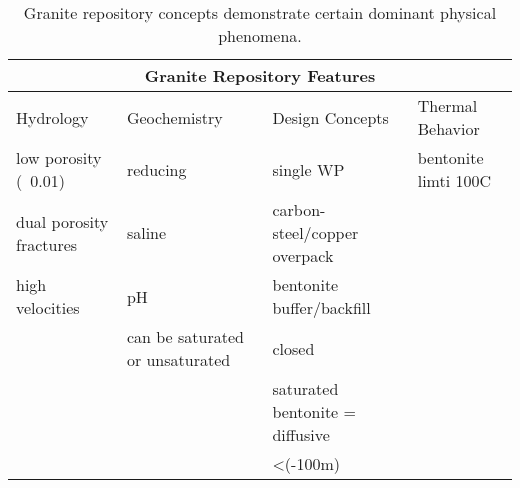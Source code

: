 %
\begin{table}
  \centering
  \footnotesize{
  \begin{tabular}{|l|l|l|l|}
    \multicolumn{4}{c}{\textbf{Granite Repository Features}}\\
    \hline
    Hydrology & Geochemistry & Design Concepts & Thermal Behavior \\ 
    \hline
    low porosity (~0.01)&reducing&single WP&bentonite limti 100C\\
    dual porosity fractures&saline&carbon-steel/copper overpack&\\
    high velocities&pH&bentonite buffer/backfill&\\
    &can be saturated or unsaturated&closed&\\
    &&saturated bentonite = diffusive&\\
    &&<(-100m)&\\
    \hline
  \end{tabular}
  \caption[Granite Repository Features]{Granite repository 
  concepts demonstrate certain dominant physical phenomena.}
  \label{tab:granite_tab}
  }
\end{table}


